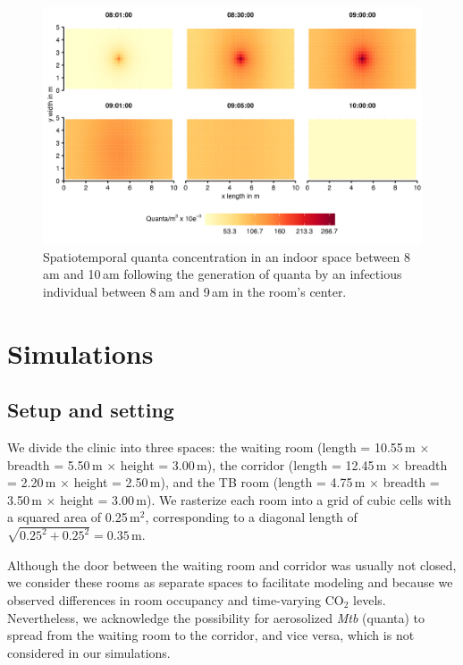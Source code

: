 \documentclass[fleqn,11pt]{wlscirep_supp}
\begin{document}
\begin{figure}[!htpb]
    \centering
    \includegraphics{tests/stm_v2-toy_example.png}
    \caption{Spatiotemporal quanta concentration in an indoor space between 8\,am and 10\,am following the generation of quanta by an infectious individual between 8\,am and 9\,am in the room's center.}
    \label{fig:toy-example}
\end{figure}

\clearpage


\section{Simulations}\label{sec:estimation}

\subsection{Setup and setting}\label{prep:building}

We divide the clinic into three spaces: the waiting room (length = 10.55\,m $\times$ breadth = 5.50\,m $\times$ height = 3.00\,m), the corridor (length = 12.45\,m $\times$ breadth = 2.20\,m $\times$ height = 2.50\,m), and the TB room (length = 4.75\,m $\times$ breadth = 3.50\,m $\times$ height = 3.00\,m). We rasterize each room into a grid of cubic cells with a squared area of 0.25\,m$^2$, corresponding to a diagonal length of $\sqrt{0.25^2 + 0.25^2} = 0.35$\,m. 

Although the door between the waiting room and corridor was usually not closed, we consider these rooms as separate spaces to facilitate modeling and because we observed differences in room occupancy and time-varying CO$_2$ levels. Nevertheless, we acknowledge the possibility for aerosolized \emph{Mtb} (quanta) to spread from the waiting room to the corridor, and vice versa, which is not considered in our simulations.  
\end{document}
